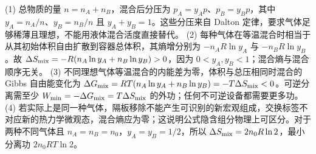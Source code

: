 (1) 总物质的量 \(n=n_A+n_B\)，混合后分压为 \(p_A=y_Ap\)、\(p_B=y_Bp\)，其中 \(y_A=n_A/n\)、\(y_B=n_B/n\) 且 \(y_A+y_B=1\)。这些分压来自 Dalton 定律，要求气体足够稀薄且理想，不能用液体混合活度直接替代。
(2) 每种气体在等温混合时相当于从其初始体积自由扩散到容器总体积，其熵增分别为 \(-n_AR\ln y_A\) 与 \(-n_BR\ln y_B\)。故 \(\Delta S_{\rm mix}=-R(n_A\ln y_A+n_B\ln y_B)>0\)，因为 \(0<y_A,y_B<1\)；混合熵与混合顺序无关。
(3) 不同理想气体等温混合的内能差为零，体积与总压相同时混合的 Gibbs 自由能变化为 \(\Delta G_{\rm mix}=RT(n_A\ln y_A+n_B\ln y_B)=-T\Delta S_{\rm mix}<0\)。可逆分离需至少 \(W_{\min}=-\Delta G_{\rm mix}=T\Delta S_{\rm mix}\) 的外功；任何不可逆设备都需要更多功。
(4) 若实际上是同一种气体，隔板移除不能产生可识别的新宏观组成，交换标签不对应新的热力学微观态，混合熵应为零；这说明公式隐含组分物理上可区分。对于两种不同气体且 \(n_A=n_B=n_0\)，\(y_A=y_B=1/2\)，所以 \(\Delta S_{\rm mix}=2n_0R\ln2\)，最小分离功 \(2n_0RT\ln2\)。

